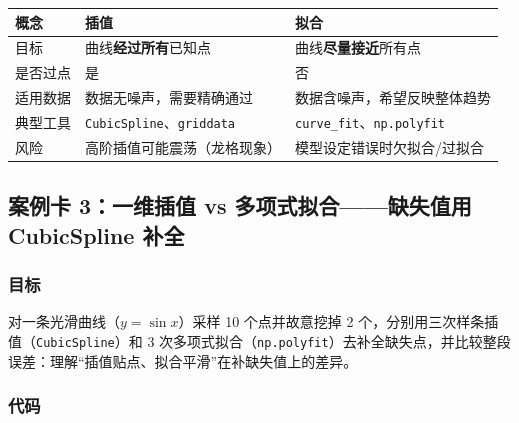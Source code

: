 {\def\LTcaptype{none} %
\begin{longtable}[]{@{}lll@{}}
\toprule\noalign{}
概念 & 插值 & 拟合 \\
\midrule\noalign{}
\endhead
\bottomrule\noalign{}
\endlastfoot
目标 & 曲线\textbf{经过所有}已知点 & 曲线\textbf{尽量接近}所有点 \\
是否过点 & 是 & 否 \\
适用数据 & 数据无噪声，需要精确通过 & 数据含噪声，希望反映整体趋势 \\
典型工具 & \texttt{CubicSpline}、\texttt{griddata} &
\texttt{curve\_fit}、\texttt{np.polyfit} \\
风险 & 高阶插值可能震荡（龙格现象） & 模型设定错误时欠拟合/过拟合 \\
\end{longtable}
}

\subsection{案例卡 3：一维插值 vs 多项式拟合------缺失值用 CubicSpline
补全}\label{ux6848ux4f8bux5361-3ux4e00ux7ef4ux63d2ux503c-vs-ux591aux9879ux5f0fux62dfux5408ux7f3aux5931ux503cux7528-cubicspline-ux8865ux5168}

\subsubsection{目标}\label{ux76eeux6807-16}

对一条光滑曲线（\(y=\sin x\)）采样 10 个点并故意挖掉 2
个，分别用三次样条插值（\texttt{CubicSpline}）和 3
次多项式拟合（\texttt{np.polyfit}）去补全缺失点，并比较整段误差：理解``插值贴点、拟合平滑''在补缺失值上的差异。

\subsubsection{代码}\label{ux4ee3ux7801-18}

